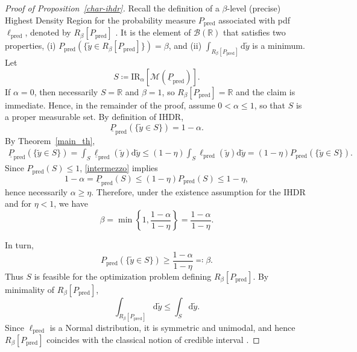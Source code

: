 \documentclass[12pt, english, oneside, a4paper]{article}
\begin{document}
\begin{proof}[Proof of Proposition~\ref{char-ihdr}]
    Recall the definition of a $\beta$-level (precise) Highest Density Region  for the probability measure $P_\text{pred}$ associated with pdf $\ell_\text{pred}$, denoted by $R_\beta[P_\text{pred}]$ \citep{hyndman}. It is the element of $\mathcal{B}(\mathbb{R})$ that satisfies two properties, (i) ${P}_\text{pred}\left(\{\tilde{y}\in R_\beta[P_\text{pred}]\}\right)= \beta$, and (ii) $\int_{R_\beta[P_\text{pred}]} \mathrm{d}\tilde{y}$ is a minimum.
    Let
    \[
    S\coloneqq \text{IR}_\alpha[\mathcal{M}(\underline{P}_\text{pred})].
    \]
    If $\alpha=0$, then necessarily $S=\mathbb{R}$ and $\beta=1$, so $R_\beta[P_\text{pred}]=\mathbb{R}$ and the claim is immediate. Hence, in the remainder of the proof, assume $0<\alpha\le 1$, so that $S$ is a proper measurable set. By definition of IHDR,
    \[
    \underline{P}_\text{pred}\left(\{\tilde{y}\in S\}\right)=1-\alpha.
    \]
    By Theorem~\ref{main_th},
    \begin{align}\label{intermezzo}
\underline{P}_\text{pred}\left(\{\tilde{y}\in S\}\right)
    = \int_S \underline{\ell}_\text{pred}(\tilde{y})  \mathrm{d}\tilde{y}
    \leq (1-\eta) \int_S {\ell}_\text{pred}(\tilde{y})  \mathrm{d}\tilde{y}
    = (1-\eta) P_\text{pred}\left(\{\tilde{y}\in S\}\right).
    \end{align}
    Since $P_\text{pred}(S)\le 1$, \eqref{intermezzo} implies
\[
1-\alpha=\underline{P}_\text{pred}(S)\le (1-\eta)P_\text{pred}(S)\le 1-\eta,
\]
hence necessarily $\alpha\ge \eta$. Therefore, under the existence assumption for the IHDR and for $\eta<1$, we have
\[
\beta=\min\left\{1,\frac{1-\alpha}{1-\eta}\right\}=\frac{1-\alpha}{1-\eta}.
\]
    
    In turn,
    \[
    P_\text{pred}\left(\{\tilde{y}\in S\}\right)\geq \frac{1-\alpha}{1-\eta}\eqqcolon \beta.
    \]
    Thus $S$ is feasible for the optimization problem defining $R_\beta[P_\text{pred}]$. By minimality of $R_\beta[P_\text{pred}]$,
    \[
    \int_{R_\beta[P_\text{pred}]} \mathrm{d}\tilde{y}
    \le
    \int_S \mathrm{d}\tilde{y}.
    \]
    Since $\ell_\text{pred}$ is a Normal distribution, it is symmetric and unimodal, and hence $R_\beta[P_\text{pred}]$ coincides with the classical notion of credible interval \citep{hyndman,ibnn}.
\end{proof}
\end{document}

